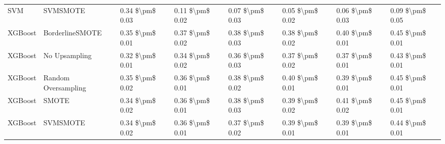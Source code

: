 \begin{tabular}{llllllll}
                            SVM &                      SVMSMOTE & 0.34 \$\textbackslash pm\$ 0.03 &           0.11 \$\textbackslash pm\$ 0.02 &       0.07 \$\textbackslash pm\$ 0.03 &        0.05 \$\textbackslash pm\$ 0.02 &                         0.06 \$\textbackslash pm\$ 0.03 &     0.09 \$\textbackslash pm\$ 0.05 \\
                        XGBoost &               BorderlineSMOTE & 0.35 \$\textbackslash pm\$ 0.01 &           0.37 \$\textbackslash pm\$ 0.02 &       0.38 \$\textbackslash pm\$ 0.03 &        0.38 \$\textbackslash pm\$ 0.02 &                         0.40 \$\textbackslash pm\$ 0.01 &     0.45 \$\textbackslash pm\$ 0.01 \\
                        XGBoost &                 No Upsampling & 0.32 \$\textbackslash pm\$ 0.01 &           0.34 \$\textbackslash pm\$ 0.02 &       0.36 \$\textbackslash pm\$ 0.03 &        0.37 \$\textbackslash pm\$ 0.02 &                         0.37 \$\textbackslash pm\$ 0.01 &     0.43 \$\textbackslash pm\$ 0.01 \\
                        XGBoost &           Random Oversampling & 0.35 \$\textbackslash pm\$ 0.02 &           0.36 \$\textbackslash pm\$ 0.01 &       0.38 \$\textbackslash pm\$ 0.02 &        0.40 \$\textbackslash pm\$ 0.01 &                         0.39 \$\textbackslash pm\$ 0.01 &     0.45 \$\textbackslash pm\$ 0.01 \\
                        XGBoost &                         SMOTE & 0.34 \$\textbackslash pm\$ 0.02 &           0.36 \$\textbackslash pm\$ 0.01 &       0.38 \$\textbackslash pm\$ 0.03 &        0.39 \$\textbackslash pm\$ 0.02 &                         0.41 \$\textbackslash pm\$ 0.02 &     0.45 \$\textbackslash pm\$ 0.01 \\
                        XGBoost &                      SVMSMOTE & 0.34 \$\textbackslash pm\$ 0.02 &           0.36 \$\textbackslash pm\$ 0.01 &       0.37 \$\textbackslash pm\$ 0.02 &        0.39 \$\textbackslash pm\$ 0.01 &                         0.39 \$\textbackslash pm\$ 0.01 &     0.44 \$\textbackslash pm\$ 0.01 \\
\bottomrule
\end{tabular}

